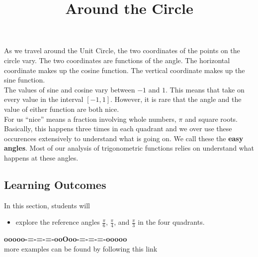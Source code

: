 \documentclass{ximera}
\title{Around the Circle}
\begin{document}
\begin{abstract}
\end{abstract}
\maketitle



As we travel around the Unit Circle, the two coordinates of the points on the circle vary.  The two coordinates are functions of the angle.   The horizontal coordinate makes up the cosine function. The vertical coordinate makes up the sine function.  \\


The values of sine and cosine vary between $-1$ and $1$.  This means that take on every value in the interval $[-1, 1]$.  However, it is rare that the angle and the value of either function are both nice. \\


For us ``nice'' means a fraction involving whole numbers, $\pi$ and square roots. \\


Basically, this happens three times in each quadrant and we over use these occurences extensively to understand what is going on.  We call these the \textbf{easy angles}.  Most of our analysis of trigonometric functions relies on understand what happens at these angles.
















\subsection*{Learning Outcomes}

\begin{sectionOutcomes}
In this section, students will 

\begin{itemize}
\item explore the reference angles $\frac{\pi}{6}$, $\frac{\pi}{4}$, and $\frac{\pi}{3}$ in the four quadrants.
\end{itemize}
\end{sectionOutcomes}











\begin{center}
\textbf{\textcolor{green!50!black}{ooooo-=-=-=-ooOoo-=-=-=-ooooo}} \\

more examples can be found by following this link\\ 

\end{center}
\end{document}
